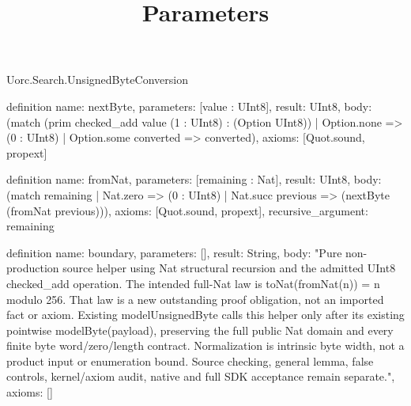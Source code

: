 \begin{lexlean}{Uorc.Search.UnsignedByteConversion}
\title{Parameters}
\begin{semanticmodule}
definition{
  name: nextByte,
  parameters: [value : UInt8],
  result: UInt8,
  body: (match (prim checked_add value (1 : UInt8) : (Option UInt8))
    | Option.none => (0 : UInt8)
    | Option.some converted => converted),
  axioms: [Quot.sound, propext]
}

definition{
  name: fromNat,
  parameters: [remaining : Nat],
  result: UInt8,
  body: (match remaining
    | Nat.zero => (0 : UInt8)
    | Nat.succ previous => (nextByte (fromNat previous))),
  axioms: [Quot.sound, propext],
  recursive_argument: remaining
}

definition{
  name: boundary,
  parameters: [],
  result: String,
  body: "Pure non-production source helper using Nat structural recursion and the admitted UInt8 checked_add operation. The intended full-Nat law is toNat(fromNat(n)) = n modulo 256. That law is a new outstanding proof obligation, not an imported fact or axiom. Existing modelUnsignedByte calls this helper only after its existing pointwise modelByte(payload), preserving the full public Nat domain and every finite byte word/zero/length contract. Normalization is intrinsic byte width, not a product input or enumeration bound. Source checking, general lemma, false controls, kernel/axiom audit, native and full SDK acceptance remain separate.",
  axioms: []
}
\end{semanticmodule}
\end{lexlean}
